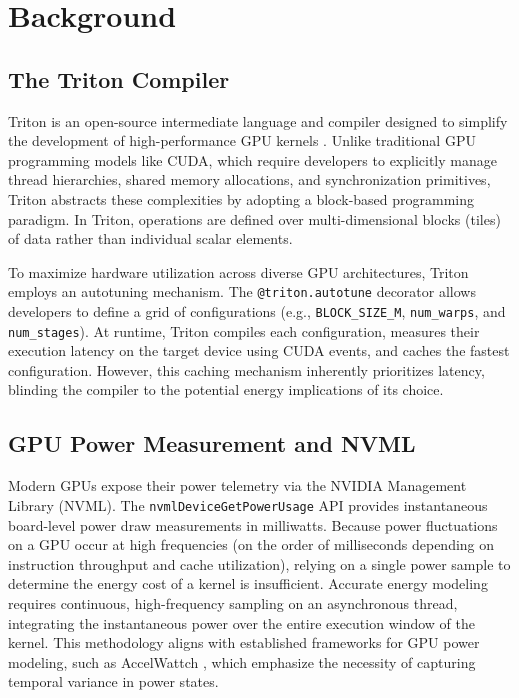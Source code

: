 \section{Background}
\label{sec:background}

\subsection{The Triton Compiler}
Triton is an open-source intermediate language and compiler designed to simplify the development of high-performance GPU kernels \cite{tillet2019triton}. Unlike traditional GPU programming models like CUDA, which require developers to explicitly manage thread hierarchies, shared memory allocations, and synchronization primitives, Triton abstracts these complexities by adopting a block-based programming paradigm. In Triton, operations are defined over multi-dimensional blocks (tiles) of data rather than individual scalar elements. 

To maximize hardware utilization across diverse GPU architectures, Triton employs an autotuning mechanism. The \texttt{@triton.autotune} decorator allows developers to define a grid of configurations (e.g., \texttt{BLOCK\_SIZE\_M}, \texttt{num\_warps}, and \texttt{num\_stages}). At runtime, Triton compiles each configuration, measures their execution latency on the target device using CUDA events, and caches the fastest configuration. However, this caching mechanism inherently prioritizes latency, blinding the compiler to the potential energy implications of its choice.

\subsection{GPU Power Measurement and NVML}
Modern GPUs expose their power telemetry via the NVIDIA Management Library (NVML). The \texttt{nvmlDeviceGetPowerUsage} API provides instantaneous board-level power draw measurements in milliwatts. Because power fluctuations on a GPU occur at high frequencies (on the order of milliseconds depending on instruction throughput and cache utilization), relying on a single power sample to determine the energy cost of a kernel is insufficient. Accurate energy modeling requires continuous, high-frequency sampling on an asynchronous thread, integrating the instantaneous power over the entire execution window of the kernel. This methodology aligns with established frameworks for GPU power modeling, such as AccelWattch \cite{kandiah2021accelwattch}, which emphasize the necessity of capturing temporal variance in power states.
